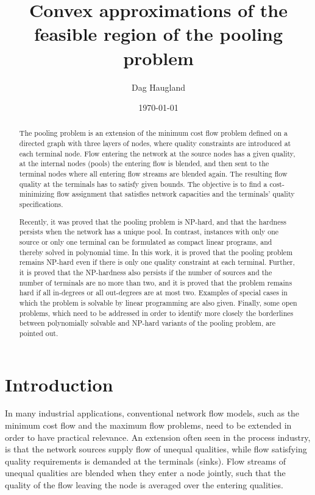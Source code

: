 \documentclass[smallcondensed]{svjour3}
\title{Convex approximations of the feasible region of the pooling problem}
\author{Dag Haugland}
\institute{Dag Haugland \at
Department of Informatics, University of Bergen,\\
P.O.Box 7803, N-5020 Bergen, Norway.\\
\email{dag@ii.uib.no}}
\date{\today}
\begin{document}
\maketitle
\begin{abstract}
The pooling problem is an extension of the minimum cost flow problem defined on a directed graph with three layers of nodes,
where quality constraints are introduced at each terminal node.
Flow entering the network at the source nodes has a given quality, at the internal nodes (pools) the entering flow is blended,
and then sent to the terminal nodes where all entering flow streams are blended again.
The resulting flow quality at the terminals has to satisfy given bounds.
The objective is to find a cost-minimizing flow assignment that satisfies network capacities and the terminals' quality specifications.

Recently, it was proved that the pooling problem is NP-hard, and that the hardness persists when the network has a unique pool.
In contrast, instances with only one source or only one terminal can be formulated as compact linear programs, and thereby solved in polynomial time.
In this work, it is proved that the pooling problem remains NP-hard even if there is only one quality constraint at each terminal.
Further, it is proved that the NP-hardness also persists if the number of sources and the number of terminals are no more than two,
and it is proved that the problem remains hard if all in-degrees or all out-degrees are at most two.
Examples of special cases in which the problem is solvable by linear programming are also given.
Finally, some open problems, which need to be addressed in order to identify more closely
the borderlines between polynomially solvable and NP-hard variants of the pooling problem, are pointed out.
\end{abstract}


\section{Introduction}
In many industrial applications,
conventional network flow models, such as the minimum cost flow and the maximum flow problems,
need to be extended in order to have practical relevance.
An extension often seen in the process industry, 
is that the network sources supply flow of unequal qualities,
while flow satisfying quality requirements is demanded at the terminals (sinks).
Flow streams of unequal qualities are blended when they enter a node jointly,
such that the quality of the flow leaving the node is averaged over the entering qualities.
\end{document}
